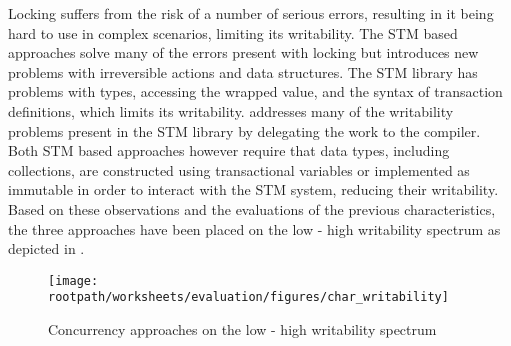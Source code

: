 Locking suffers from the risk of a number of serious errors, resulting in it being hard to use in complex scenarios, limiting its writability. The \ac{STM} based approaches solve many of the errors present with locking but introduces new problems with irreversible actions and data structures. The \ac{STM} library has problems with types, accessing the wrapped value, and the syntax of transaction definitions, which limits its writability. \stmname addresses many of the writability problems present in the \ac{STM} library by delegating the work to the compiler. Both \ac{STM} based approaches however require that data types, including collections, are constructed using transactional variables or implemented as immutable in order to interact with the \ac{STM} system, reducing their writability. Based on these observations and the evaluations of the previous characteristics, the three approaches have been placed on the low - high writability spectrum as depicted in .

\begin{figure}[htbp]
\centering
\texttt{[image: \\rootpath/worksheets/evaluation/figures/char\_writability]}
\caption{Concurrency approaches on the low - high writability spectrum}
\label{fig:char_tl_writability}
\end{figure}
\worksheetend